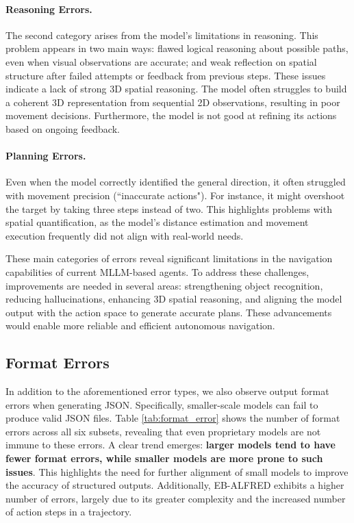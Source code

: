 \paragraph{Reasoning Errors.}
The second category arises from the model's limitations in reasoning. This problem appears in two main ways: flawed logical reasoning about possible paths, even when visual observations are accurate; and weak reflection on spatial structure after failed attempts or feedback from previous steps. These issues indicate a lack of strong 3D spatial reasoning. The model often struggles to build a coherent 3D representation from sequential 2D observations, resulting in poor movement decisions. Furthermore, the model is not good at refining its actions based on ongoing feedback.

\paragraph{Planning Errors.} Even when the model correctly identified the general direction, it often struggled with movement precision (``inaccurate actions"). For instance, it might overshoot the target by taking three steps instead of two. This highlights problems with spatial quantification, as the model's distance estimation and movement execution frequently did not align with real-world needs. 


These main categories of errors reveal significant limitations in the navigation capabilities of current MLLM-based agents. To address these challenges, improvements are needed in several areas: strengthening object recognition, reducing hallucinations, enhancing 3D spatial reasoning, and aligning the model output with the action space to generate accurate plans. These advancements would enable more reliable and efficient autonomous navigation.



\subsection{Format Errors}
In addition to the aforementioned error types, we also observe output format errors when generating JSON. Specifically, smaller-scale models can fail to produce valid JSON files. Table \ref{tab:format_error} shows the number of format errors across all six subsets, revealing that even proprietary models are not immune to these errors. A clear trend emerges: \textbf{larger models tend to have fewer format errors, while smaller models are more prone to such issues}. This highlights the need for further alignment of small models to improve the accuracy of structured outputs. Additionally, EB-ALFRED exhibits a higher number of errors, largely due to its greater complexity and the increased number of action steps in a trajectory.

